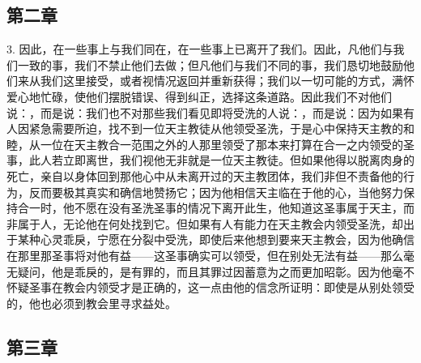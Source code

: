 \subsection{第二章}

3. 因此，在一些事上与我们同在，在一些事上已离开了我们。因此，凡他们与我们一致的事，我们不禁止他们去做；但凡他们与我们不同的事，我们恳切地鼓励他们来从我们这里接受，或者视情况返回并重新获得；我们以一切可能的方式，满怀爱心地忙碌，使他们摆脱错误、得到纠正，选择这条道路。因此我们不对他们说：，而是说：我们也不对那些我们看见即将受洗的人说：，而是说：因为如果有人因紧急需要所迫，找不到一位天主教徒从他领受圣洗，于是心中保持天主教的和睦，从一位在天主教合一范围之外的人那里领受了那本来打算在合一之内领受的圣事，此人若立即离世，我们视他无非就是一位天主教徒。但如果他得以脱离肉身的死亡，亲自以身体回到那他心中从未离开过的天主教团体，我们非但不责备他的行为，反而要极其真实和确信地赞扬它；因为他相信天主临在于他的心，当他努力保持合一时，他不愿在没有圣洗圣事的情况下离开此生，他知道这圣事属于天主，而非属于人，无论他在何处找到它。但如果有人有能力在天主教会内领受圣洗，却出于某种心灵乖戾，宁愿在分裂中受洗，即使后来他想到要来天主教会，因为他确信在那里那圣事将对他有益——这圣事确实可以领受，但在别处无法有益——那么毫无疑问，他是乖戾的，是有罪的，而且其罪过因蓄意为之而更加昭彰。因为他毫不怀疑圣事在教会内领受才是正确的，这一点由他的信念所证明：即使是从别处领受的，他也必须到教会里寻求益处。\par


\subsection{第三章}

